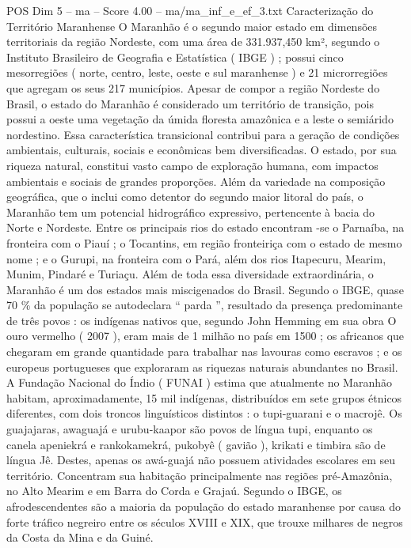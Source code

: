 \begin{textsample}{POS Dim 5 – ma – Score 4.00 – ma/ma\_inf\_e\_ef\_3.txt}  \label{ex:f5_pos_176}
Caracterização do Território Maranhense O Maranhão é o segundo maior estado em dimensões territoriais da região Nordeste, com uma área de 331.937,450 km², segundo o Instituto Brasileiro de Geografia e Estatística ( IBGE ) ; possui cinco mesorregiões ( norte, centro, leste, oeste e sul maranhense ) e 21 microrregiões que agregam os seus 217 municípios.
Apesar de compor a região Nordeste do Brasil, o estado do Maranhão é considerado um território de transição, pois possui a oeste uma vegetação da úmida floresta amazônica e a leste o semiárido nordestino.
Essa característica transicional contribui para a geração de condições ambientais, culturais, sociais e econômicas bem diversificadas.
O estado, por sua riqueza natural, constitui vasto campo de exploração humana, com impactos ambientais e sociais de grandes proporções.
Além da variedade na composição geográfica, que o inclui como detentor do segundo maior litoral do país, o Maranhão tem um potencial hidrográfico expressivo, pertencente à bacia do Norte e Nordeste.
Entre os principais rios do estado encontram -se o Parnaíba, na fronteira com o Piauí ; o Tocantins, em região fronteiriça com o estado de mesmo nome ; e o Gurupi, na fronteira com o Pará, além dos rios Itapecuru, Mearim, Munim, Pindaré e Turiaçu.
Além de toda essa diversidade extraordinária, o Maranhão é um dos estados mais miscigenados do Brasil.
Segundo o IBGE, quase 70 \% da população se autodeclara “ parda ”, resultado da presença predominante de três povos : os indígenas nativos que, segundo John Hemming em sua obra O ouro vermelho ( 2007 ), eram mais de 1 milhão no país em 1500 ; os africanos que chegaram em grande quantidade para trabalhar nas lavouras como escravos ; e os europeus portugueses que exploraram as riquezas naturais abundantes no Brasil.
A Fundação Nacional do Índio ( FUNAI ) estima que atualmente no Maranhão habitam, aproximadamente, 15 mil indígenas, distribuídos em sete grupos étnicos diferentes, com dois troncos linguísticos distintos : o tupi-guarani e o macrojê.
Os guajajaras, awaguajá e urubu-kaapor são povos de língua tupi, enquanto os canela apeniekrá e rankokamekrá, pukobyê ( gavião ), krikati e timbira são de língua Jê.
Destes, apenas os awá-guajá não possuem atividades escolares em seu território.
Concentram sua habitação principalmente nas regiões pré-Amazônia, no Alto Mearim e em Barra do Corda e Grajaú.
Segundo o IBGE, os afrodescendentes são a maioria da população do estado maranhense por causa do forte tráfico negreiro entre os séculos XVIII e XIX, que trouxe milhares de negros da Costa da Mina e da Guiné.

\end{textsample}
